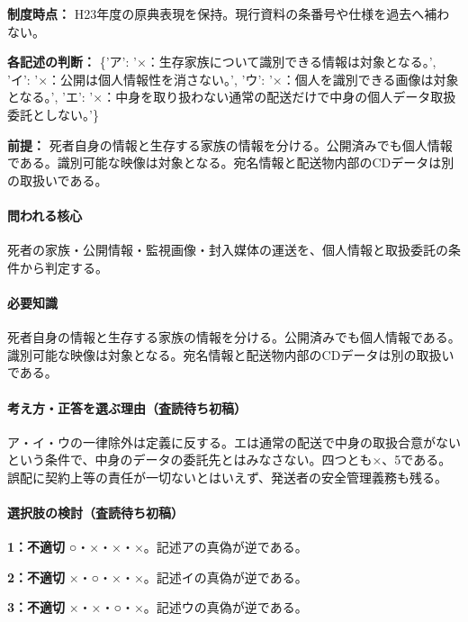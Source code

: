 \noindent\textbf{制度時点：} H23年度の原典表現を保持。現行資料の条番号や仕様を過去へ補わない。\par

\noindent\textbf{各記述の判断：} \{'ア': '×：生存家族について識別できる情報は対象となる。', 'イ': '×：公開は個人情報性を消さない。', 'ウ': '×：個人を識別できる画像は対象となる。', 'エ': '×：中身を取り扱わない通常の配送だけで中身の個人データ取扱委託としない。'\}\par

\noindent\textbf{前提：} 死者自身の情報と生存する家族の情報を分ける。公開済みでも個人情報である。識別可能な映像は対象となる。宛名情報と配送物内部のCDデータは別の取扱いである。\par

\paragraph{問われる核心} 死者の家族・公開情報・監視画像・封入媒体の運送を、個人情報と取扱委託の条件から判定する。

\paragraph{必要知識} 死者自身の情報と生存する家族の情報を分ける。公開済みでも個人情報である。識別可能な映像は対象となる。宛名情報と配送物内部のCDデータは別の取扱いである。

\paragraph{考え方・正答を選ぶ理由（査読待ち初稿）} ア・イ・ウの一律除外は定義に反する。エは通常の配送で中身の取扱合意がないという条件で、中身のデータの委託先とはみなさない。四つとも×、5である。誤配に契約上等の責任が一切ないとはいえず、発送者の安全管理義務も残る。

\paragraph{選択肢の検討（査読待ち初稿）}\mbox{}\par

\noindent\textbf{1：不適切} ○・×・×・×。記述アの真偽が逆である。\par

\noindent\textbf{2：不適切} ×・○・×・×。記述イの真偽が逆である。\par

\noindent\textbf{3：不適切} ×・×・○・×。記述ウの真偽が逆である。\par

